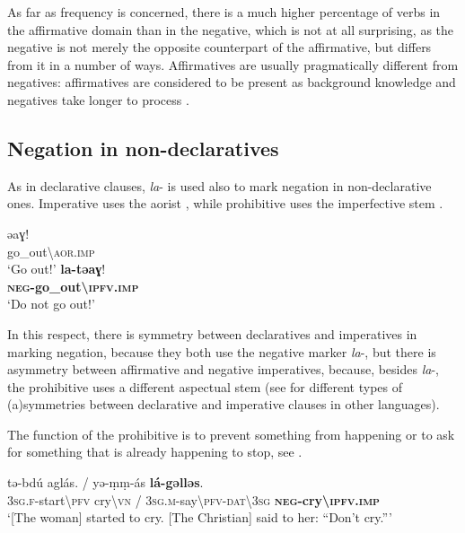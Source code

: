 \documentclass[output=paper,colorlinks,citecolor=brown]{langscibook}
\begin{document}
As far as frequency is concerned, there is a much higher percentage of verbs in the affirmative domain than in the negative, which is not at all surprising, as the negative is not merely the opposite counterpart of the affirmative, but differs from it in a number of ways. Affirmatives are usually pragmatically different from negatives: affirmatives are considered to be present as background knowledge and negatives take longer to process \citep{Givon1978,Horn1989,Miestamo2005}.


\subsection{Negation in non-declaratives}\label{sec:siw:2.2}

As in declarative clauses, \textit{la}{}- is used also to mark negation in non-declarative ones. Imperative uses the aorist , while prohibitive uses the imperfective stem .


\ea\label{ex:siw:11}
    \ea\label{ex:siw:11a}
        \gll ə{\fdot}{\fdot}aɣ!\\
             go\_out{\textbackslash}\textsc{aor.imp} \\
        \glt ‘Go out!’ 
    \ex\label{ex:siw:11b}
        \gll \textbf{la-tə{\fdot}{\fdot}aɣ}! \\
             \textbf{\textsc{neg}-go\_out{\textbackslash}\textsc{ipfv.imp}}\\
        \glt ‘Do not go out!’
    \z
\z 

In this respect, there is symmetry between declaratives and imperatives in marking negation, because they both use the negative marker \textit{la}{}-, but there is asymmetry between affirmative and negative imperatives, because, besides \textit{la}{}-, the prohibitive uses a different aspectual stem (see \citealt{MiestamoAuwera2007} for different types of (a)symmetries between declarative and imperative clauses in other languages).

The function of the prohibitive is to prevent something from happening or to ask for something that is already happening to stop, see .

\ea\label{ex:siw:12}
    \gll tə-bdú aglás. / yə-ṃṃ{}-ás \textbf{lá-gəlləs}. \\
         \textsc{3sg.f-}start{\textbackslash}\textsc{pfv} cry{\textbackslash}\textsc{vn} / \textsc{3sg.m}-say{\textbackslash}\textsc{pfv-dat\textbackslash3sg} \textbf{\textsc{neg}-cry\textbackslash\textsc{ipfv.imp}} \\
    \glt ‘[The woman] started to cry. [The Christian] said to her: “Don’t cry.”’
\z
\end{document}
